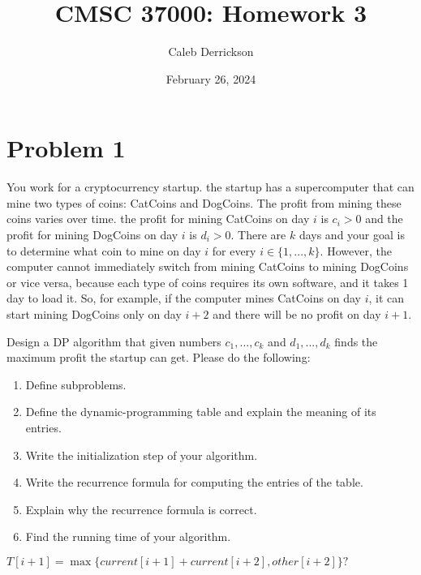 

\title{CMSC 37000: Homework 3}
\author{Caleb Derrickson}
\date{February 26, 2024}


\onehalfspacing
\maketitle
\allowdisplaybreaks

\tableofcontents

\newpage
\section{Problem 1}
You work for a cryptocurrency startup. the startup has a supercomputer that can mine two types of coins: CatCoins and DogCoins. The profit from mining these coins varies over time. the profit for mining CatCoins on day $i$ is $c_i > 0$ and the profit for mining DogCoins on day $i$ is $d_i > 0$. There are $k$ days and your goal is to determine what coin to mine on day $i$ for every $i \in \{1, ..., k\}$. However, the computer cannot immediately switch from mining CatCoins to mining DogCoins or vice versa, because each type of coins requires its own software, and it takes 1 day to load it. So, for example, if the computer mines CatCoins on day $i$, it can start mining DogCoins only on day $i+2$ and there will be no profit on day $i+1$. \par

\hop
Design a DP algorithm that given numbers $c_1, ..., c_k$ and $d_1, ..., d_k$ finds the maximum profit the startup can get. Please do the following:
\begin{enumerate}
    \item Define subproblems. 
    \item Define the dynamic-programming table and explain the meaning of its entries. 
    \item Write the initialization step of your algorithm.
    \item Write the recurrence formula for computing the entries of the table.
    \item Explain why the recurrence formula is correct. 
    \item Find the running time of your algorithm.
\end{enumerate}
\partbreak
\begin{solution}

    $T[i+1] = \max\{current[i+1] + current[i+2], other[i+2]\}?$
\end{solution}

